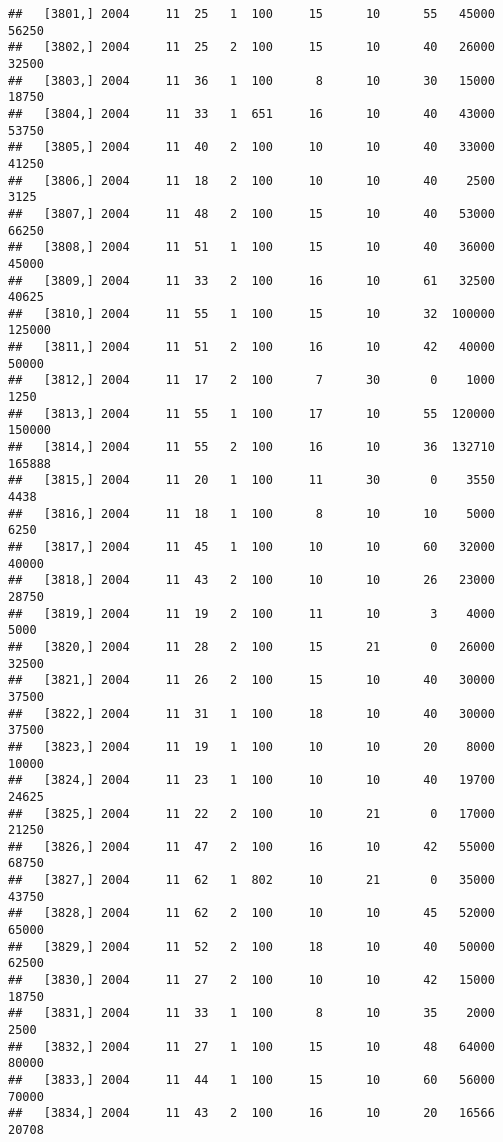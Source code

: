 \documentclass{article}\usepackage[]{graphicx}\usepackage[]{color}
\makeatletter
\newenvironment{kframe}{%
 \def\at@end@of@kframe{}%
 \ifinner\ifhmode%
  \def\at@end@of@kframe{\end{minipage}}%
  \begin{minipage}{\columnwidth}%
 \fi\fi%
 \def\FrameCommand##1{\hskip\@totalleftmargin \hskip-\fboxsep
 \colorbox{shadecolor}{##1}\hskip-\fboxsep
     \hskip-\linewidth \hskip-\@totalleftmargin \hskip\columnwidth}%
 \MakeFramed {\advance\hsize-\width
   \@totalleftmargin\z@ \linewidth\hsize
   \@setminipage}}%
 {\par\unskip\endMakeFramed%
 \at@end@of@kframe}
\newenvironment{knitrout}{}{} %
\makeatother
\begin{document}
\begin{knitrout}
\begin{kframe}
\begin{verbatim}
##   [3801,] 2004     11  25   1  100     15      10      55   45000   56250
##   [3802,] 2004     11  25   2  100     15      10      40   26000   32500
##   [3803,] 2004     11  36   1  100      8      10      30   15000   18750
##   [3804,] 2004     11  33   1  651     16      10      40   43000   53750
##   [3805,] 2004     11  40   2  100     10      10      40   33000   41250
##   [3806,] 2004     11  18   2  100     10      10      40    2500    3125
##   [3807,] 2004     11  48   2  100     15      10      40   53000   66250
##   [3808,] 2004     11  51   1  100     15      10      40   36000   45000
##   [3809,] 2004     11  33   2  100     16      10      61   32500   40625
##   [3810,] 2004     11  55   1  100     15      10      32  100000  125000
##   [3811,] 2004     11  51   2  100     16      10      42   40000   50000
##   [3812,] 2004     11  17   2  100      7      30       0    1000    1250
##   [3813,] 2004     11  55   1  100     17      10      55  120000  150000
##   [3814,] 2004     11  55   2  100     16      10      36  132710  165888
##   [3815,] 2004     11  20   1  100     11      30       0    3550    4438
##   [3816,] 2004     11  18   1  100      8      10      10    5000    6250
##   [3817,] 2004     11  45   1  100     10      10      60   32000   40000
##   [3818,] 2004     11  43   2  100     10      10      26   23000   28750
##   [3819,] 2004     11  19   2  100     11      10       3    4000    5000
##   [3820,] 2004     11  28   2  100     15      21       0   26000   32500
##   [3821,] 2004     11  26   2  100     15      10      40   30000   37500
##   [3822,] 2004     11  31   1  100     18      10      40   30000   37500
##   [3823,] 2004     11  19   1  100     10      10      20    8000   10000
##   [3824,] 2004     11  23   1  100     10      10      40   19700   24625
##   [3825,] 2004     11  22   2  100     10      21       0   17000   21250
##   [3826,] 2004     11  47   2  100     16      10      42   55000   68750
##   [3827,] 2004     11  62   1  802     10      21       0   35000   43750
##   [3828,] 2004     11  62   2  100     10      10      45   52000   65000
##   [3829,] 2004     11  52   2  100     18      10      40   50000   62500
##   [3830,] 2004     11  27   2  100     10      10      42   15000   18750
##   [3831,] 2004     11  33   1  100      8      10      35    2000    2500
##   [3832,] 2004     11  27   1  100     15      10      48   64000   80000
##   [3833,] 2004     11  44   1  100     15      10      60   56000   70000
##   [3834,] 2004     11  43   2  100     16      10      20   16566   20708

\end{verbatim}
\end{kframe}
\end{knitrout}
\end{document}
